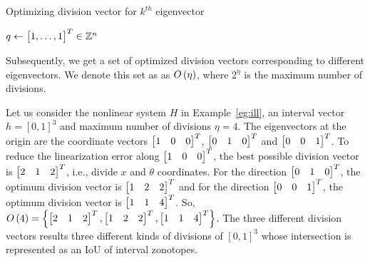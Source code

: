 \begin{algorithm}
\caption{Optimizing division vector for $k^{th}$
eigenvector} $q\gets \begin{bmatrix}1,\ldots,1\end{bmatrix}^T\in\mathbb{Z}^n$\;
\end{algorithm}
%
Subsequently, we get a set of optimized division vectors corresponding
to different eigenvectors.  We denote this set as as $O\left(\eta\right)$,
where $2^\eta$ is the maximum number of divisions.
%
\begin{example}
Let us consider the nonlinear system $H$ in Example~\ref{eg:ill}, an
interval vector $h = [0,1]^3$ and maximum number of divisions $\eta =
4$.  The eigenvectors at the origin are the coordinate vectors
$\begin{bmatrix}1 & 0 & 0\end{bmatrix}^T$, $\begin{bmatrix}0 & 1 & 0\end{bmatrix}^T$ and $\begin{bmatrix}0 &
0 & 1\end{bmatrix}^T$.  To reduce the linearization error along $\begin{bmatrix}1 & 0 &
0\end{bmatrix}^T$, the best possible division vector is $\begin{bmatrix}2 & 1 & 2\end{bmatrix}^T$,
i.e., divide $x$ and $\theta$ coordinates.  For the direction
$\begin{bmatrix}0 & 1 &0\end{bmatrix}^T$, the optimum division vector is $\begin{bmatrix}1 &
2 & 2\end{bmatrix}^T$ and for the direction $\begin{bmatrix}0 & 0 & 1\end{bmatrix}^T$, the optimum
division vector is $\begin{bmatrix}1 & 1 & 4\end{bmatrix}^T$.  So, $O\left(4\right)
= \left\{\begin{bmatrix}2 & 1 & 2\end{bmatrix}^T, \begin{bmatrix}1 & 2 & 2\end{bmatrix}^T, \begin{bmatrix}1 & 1
& 4\end{bmatrix}^T\right\}$.  The three different division vectors results three
different kinds of divisions of $[0,1]^3$ whose intersection is
represented as an IoU of interval zonotopes.
\end{example}
%
